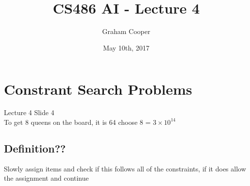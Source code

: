\documentclass[12pt]{article}
\title{\vspace{-15ex}CS486 AI - Lecture 4\vspace{-1ex}}
\date{May 10th, 2017}
\author{Graham Cooper}
\begin{document}
	\maketitle
	
	\section*{Constrant Search Problems}
	Lecture 4 Slide 4\\
	To get 8 queens on the board, it is 64 choose 8 = $3 \times 10^{14}$\\
	
	\subsection*{Definition??}
	Slowly assign items and check if this follows all of the constraints, if it does allow the assignment and continue
	
\end{document}
